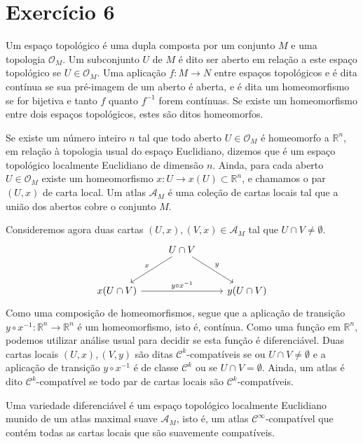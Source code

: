 \section*{Exercício 6}
Um espaço topológico é uma dupla  composta por um conjunto \(M\) e uma topologia \(\mathcal{O}_M\). Um subconjunto \(U\) de \(M\) é dito ser aberto em relação a este espaço topológico se \(U \in \mathcal{O}_M\). Uma aplicação \(f : M \to N\) entre espaços topológicos  e  é dita contínua se sua pré-imagem de um aberto é aberta, e é dita um homeomorfismo se for bijetiva e tanto \(f\) quanto \(f^{-1}\) forem contínuas. Se existe um homeomorfismo entre dois espaços topológicos, estes são ditos homeomorfos.

Se existe um número inteiro \(n\) tal que todo aberto \(U \in \mathcal{O}_M\) é homeomorfo a \(\mathbb{R}^n\), em relação à topologia usual do espaço Euclidiano, dizemos que  é um espaço topológico localmente Euclidiano de dimensão \(n\). Ainda, para cada aberto \(U \in \mathcal{O}_M\) existe um homeomorfismo \(x : U \to x(U) \subset \mathbb{R}^n\), e chamamos o par \((U,x)\) de carta local. Um atlas \(\mathscr{A}_M\) é uma coleção de cartas locais tal que a união dos abertos cobre o conjunto \(M\).

Consideremos agora duas cartas \((U, x), (V, x) \in \mathscr{A}_M\) tal que \(U \cap V \neq \emptyset\).
\begin{equation*}
    \begin{tikzcd}[column sep = normal, row sep = large]
        &\arrow[swap]{dl}{x} U \cap V\arrow{dr}{y}&\\
        x(U\cap V) \arrow{rr}{y \circ x^{-1}} & & y(U\cap V)
    \end{tikzcd}
\end{equation*}
Como uma composição de homeomorfismos, segue que a aplicação de transição \(y \circ x^{-1} : \mathbb{R}^n \to \mathbb{R}^n\) é um homeomorfismo, isto é, contínua. Como uma função em \(\mathbb{R}^n\), podemos utilizar análise usual para decidir se esta função é diferenciável. Duas cartas locais \((U, x), (V, y)\) são ditas \(\mathcal{C}^k\)-compatíveis se ou \(U \cap V \neq \emptyset\) e a aplicação de transição \(y \circ x^{-1}\) é de classe \(\mathcal{C}^k\) ou se \(U \cap V = \emptyset\). Ainda, um atlas é dito \(\mathcal{C}^k\)-compatível se todo par de cartas locais são \(\mathcal{C}^k\)-compatíveis.

Uma variedade diferenciável  é um espaço topológico  localmente Euclidiano munido de um atlas maximal suave \(\mathscr{A}_M\), isto é, um atlas \(\mathcal{C}^\infty\)-compatível que contém todas as cartas locais que são suavemente compatíveis.
